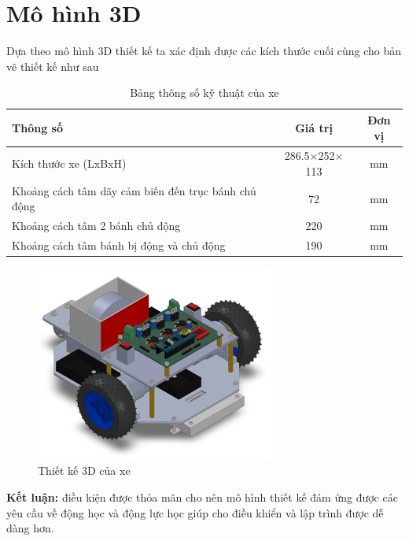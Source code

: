     \section{Mô hình 3D}
        \hspace*{0.6cm}Dựa theo mô hình 3D thiết kế ta xác định được các kích thước cuối cùng cho bản vẽ thiết kế như sau
         \begin{table}[h!]
            \centering
            \caption{Bảng thông số kỹ thuật của xe}
            \begin{tabular}{|l|c|c|}
                \hline
                \textbf{Thông số} & \textbf{Giá trị} & \textbf{Đơn vị} \\ \hline
                Kích thước xe (LxBxH) & 286.5$\times$252$\times$113 & mm \\ \hline
                Khoảng cách tâm dãy cảm biến đến trục bánh chủ động & 72 & mm \\ \hline
                Khoảng cách tâm 2 bánh chủ động & 220 & mm \\ \hline
                Khoảng cách tâm bánh bị động và chủ động & 190 & mm \\ \hline
            \end{tabular}
        \end{table}
        \begin{figure}[H]
            \centering
            \includegraphics[width=0.7\textwidth]{pictures/chapter3/3d.png}
            \caption{Thiết kế 3D của xe}
            \label{3d}
        \end{figure}
        \hspace*{0.6cm}\textbf{Kết luận:} điều kiện được thỏa mãn cho nên mô hình thiết kế đám ứng được các yêu cầu về động học và động lực học giúp cho điều khiển và lập trình được dễ dàng hơn.


